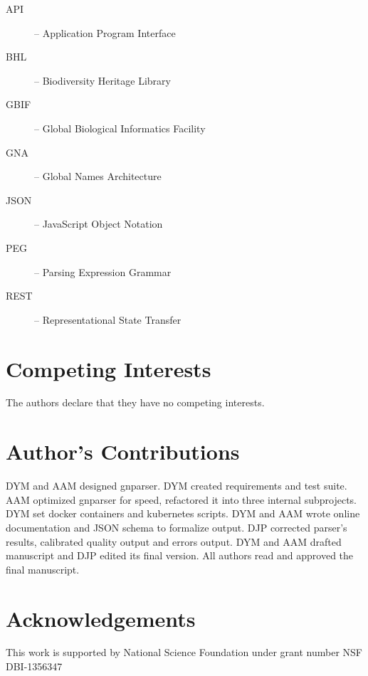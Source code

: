 \documentclass{bmcart}
\begin{document}
\begin{description}
  \item[API] -- Application Program Interface
  \item[BHL] -- Biodiversity Heritage Library
  \item[GBIF] -- Global Biological Informatics Facility
  \item[GNA] -- Global Names Architecture
  \item[JSON] -- JavaScript Object Notation
  \item[PEG] -- Parsing Expression Grammar
  \item[REST] -- Representational State Transfer
\end{description}

\section*{Competing Interests}

The authors declare that they have no competing interests.

\section*{Author's Contributions}

DYM and AAM designed gnparser. DYM created requirements and test suite. AAM
optimized gnparser for speed, refactored it into three internal subprojects.
DYM set docker containers and kubernetes scripts. DYM and AAM wrote online
documentation and JSON schema to formalize output. DJP corrected parser's
results, calibrated quality output and errors output. DYM and AAM drafted
manuscript and DJP edited its final version. All authors read and approved the
final manuscript.

\section*{Acknowledgements}

This work is supported by National Science Foundation under grant number NSF
DBI-1356347



\end{document}
